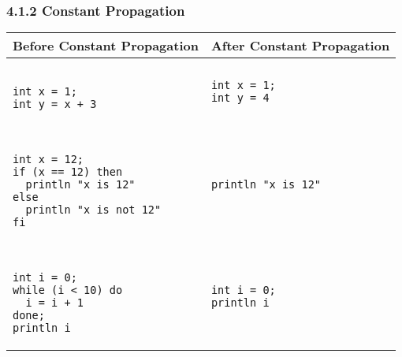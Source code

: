 \documentclass[10pt,a4paper]{report}
\newenvironment{tabularverbatim}
 {\VerbatimEnvironment
  \begin{BVerbatim}[baseline=c,formatcom=\setlength{\baselineskip}{\normalbaselineskip}]}
 {\end{BVerbatim}}
\begin{document}
  \subsubsection*{4.1.2 Constant Propagation}
  \begin{center}
    \begin{tabular}{| m{5cm} | m{5cm} |}
      \hline
      Before Constant Propagation & After Constant Propagation \\
      \hline
      \begin{tabularverbatim}

int x = 1;
int y = x + 3

      \end{tabularverbatim}
       &
      \begin{tabularverbatim}
int x = 1; 
int y = 4
      \end{tabularverbatim}
      \\
      \hline
      \begin{tabularverbatim}
      
int x = 12;
if (x == 12) then
  println "x is 12"
else
  println "x is not 12"
fi

      \end{tabularverbatim}
      &
      \begin{tabularverbatim}
println "x is 12"
      \end{tabularverbatim}
      \\
      \hline
      \begin{tabularverbatim}

int i = 0;
while (i < 10) do
  i = i + 1
done;
println i

      \end{tabularverbatim}
      &
      \begin{tabularverbatim}
int i = 0;
println i
      \end{tabularverbatim}
      \\
      \hline
    \end{tabular}
  \end{center}
\end{document}
